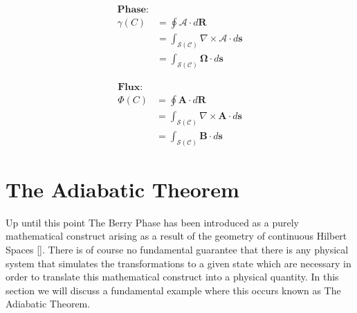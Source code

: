 \documentclass{article}
\begin{document}
    \begin{minipage}{0.4\textwidth}
       \begin{align*}
         \textbf{Phase:}&\\
         \gamma(C) &= \oint \bm{\mathcal{A}} \cdot d\bm{R} \\
                   &= \int_{\mathcal{S}(\mathcal{C})} 
                      \nabla \times \bm{\mathcal{A}} \cdot d\bm{s}\\
                   &= \int_{\mathcal{S}(\mathcal{C})} \bm{\Omega} \cdot d\bm{s}
       \end{align*}
    \end{minipage}
    \hspace{0.05\textwidth}
    \begin{minipage}{0.4\textwidth}
      \begin{align*}
        \textbf{Flux:}&\\
        \Phi(C) &= \oint \bm{A} \cdot d\bm{R} \\
                &= \int_{\mathcal{S}(\mathcal{C})}
                   \nabla \times \bm{A} \cdot d\bm{s} \\
                &= \int_{\mathcal{S}(\mathcal{C})} \bm{B} \cdot d\bm{s}
      \end{align*}
    \end{minipage}

\section{The Adiabatic Theorem}\label{sec:adiabatic_theorem}

Up until this point The Berry Phase has been introduced as a purely mathematical construct arising as a result of the geometry of continuous Hilbert Spaces \ref{}. There is of course no fundamental guarantee that there is any physical system that simulates the transformations to a given state which are necessary in order to translate this mathematical construct into a physical quantity. In this section we will discuss a fundamental example where this occurs known as The Adiabatic Theorem.\\
\end{document}
